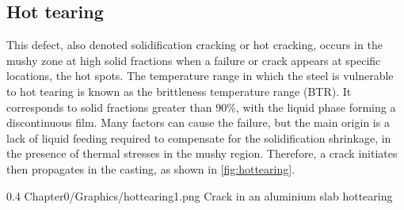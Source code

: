 \subsection*{Hot tearing} 
This defect, also denoted solidification cracking or hot cracking, occurs in the mushy zone at high solid fractions when a failure
or crack appears at specific locations, the hot spots. The temperature range in which the steel is vulnerable to hot tearing is known as the brittleness temperature range (BTR). It corresponds to solid fractions greater than \num{90}\%, with the liquid phase forming a discontinuous film. Many factors can cause the failure, but the main origin is a lack of liquid feeding required to compensate for the solidification shrinkage, in the presence of thermal stresses in the mushy region. Therefore, a crack initiates then propagates in the casting, as shown in \cref{fig:hottearing}. 
\begin{figureth}
{0.4}
{Chapter0/Graphics/hottearing1.png}
{Crack in an aluminium slab}
{hottearing}
\end{figureth}
